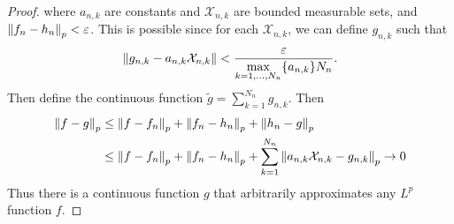 \documentclass{article} %
\theoremstyle{plain}
\newcommand{\E}{\varepsilon}
\numberwithin{equation}{section} %
\numberwithin{figure}{section} %
\numberwithin{table}{section} %
\begin{document}
\begin{proof}
    where $a_{n,k}$ are constants and $\mathcal{X}_{n,k}$ are bounded measurable sets, and $\norm{f_n - h_n}_p < \E$.  This is possible since for each $\mathcal{X}_{n,k}$, we can define $g_{n,k}$ such that
    \begin{align*}
        \norm{g_{n,k} - a_{n,k}\mathcal{X}_{n,k}} < \frac{\E}{\displaystyle\max_{k=1,\dots,N_n}\{a_{n,k}\}N_n}.
    \end{align*}
    Then define the continuous function $\tilde{g} = \sum_{k=1}^{N_n} g_{n,k}$.  Then
    \begin{align*}
        \norm{f - g}_p &\leq \norm{f - f_n}_p + \norm{f_n - h_n}_p + \norm{h_n - g}_p \\
        &\leq \norm{f - f_n}_p + \norm{f_n - h_n}_p + \sum_{k=1}^{N_n}\norm{a_{n,k}\mathcal{X}_{n,k} - g_{n,k}}_p \rightarrow 0
    \end{align*}
    Thus there is a continuous function $g$ that arbitrarily approximates any $L^p$ function $f$.
\end{proof}
\end{document}
